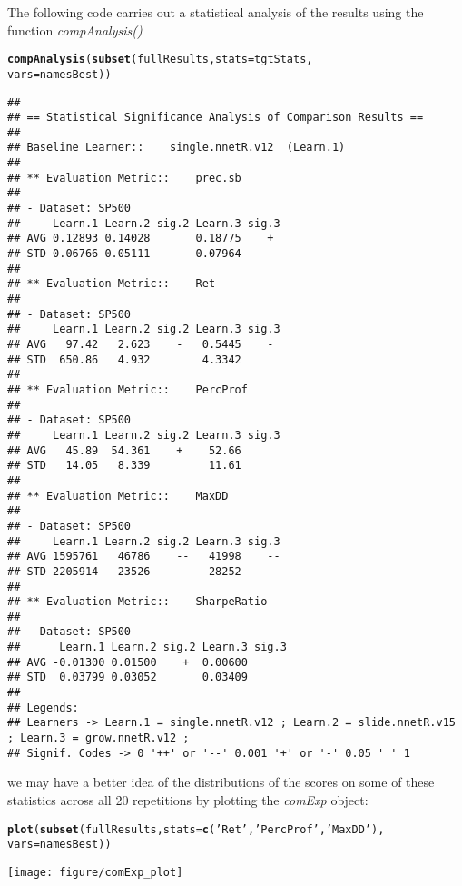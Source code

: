 \documentclass{article}\usepackage[]{graphicx}\usepackage[]{color}
\makeatletter
\def\maxwidth{ %
  \ifdim\Gin@nat@width>\linewidth
    \linewidth
  \else
    \Gin@nat@width
  \fi
}
\newcommand{\hlstr}[1]{\textcolor[rgb]{0.192,0.494,0.8}{#1}}%
\newcommand{\hlstd}[1]{\textcolor[rgb]{0.345,0.345,0.345}{#1}}%
\newcommand{\hlkwc}[1]{\textcolor[rgb]{0.333,0.667,0.333}{#1}}%
\newcommand{\hlkwd}[1]{\textcolor[rgb]{0.737,0.353,0.396}{\textbf{#1}}}%
\newenvironment{kframe}{%
 \def\at@end@of@kframe{}%
 \ifinner\ifhmode%
  \def\at@end@of@kframe{\end{minipage}}%
  \begin{minipage}{\columnwidth}%
 \fi\fi%
 \def\FrameCommand##1{\hskip\@totalleftmargin \hskip-\fboxsep
 \colorbox{shadecolor}{##1}\hskip-\fboxsep
     \hskip-\linewidth \hskip-\@totalleftmargin \hskip\columnwidth}%
 \MakeFramed {\advance\hsize-\width
   \@totalleftmargin\z@ \linewidth\hsize
   \@setminipage}}%
 {\par\unskip\endMakeFramed%
 \at@end@of@kframe}
\newenvironment{knitrout}{}{} %
\makeatother
\begin{document}
The following code carries out a statistical analysis of the results using the function \textit{compAnalysis()}
\begin{knitrout}
\color{fgcolor}\begin{kframe}
\begin{alltt}
\hlkwd{compAnalysis}\hlstd{(}\hlkwd{subset}\hlstd{(fullResults,} \hlkwc{stats} \hlstd{= tgtStats,}
                   \hlkwc{vars} \hlstd{= namesBest))}
\end{alltt}
\begin{verbatim}
## 
## == Statistical Significance Analysis of Comparison Results ==
## 
## Baseline Learner::	 single.nnetR.v12  (Learn.1)
## 
## ** Evaluation Metric::	 prec.sb 
## 
## - Dataset: SP500 
##     Learn.1 Learn.2 sig.2 Learn.3 sig.3
## AVG 0.12893 0.14028       0.18775    + 
## STD 0.06766 0.05111       0.07964      
## 
## ** Evaluation Metric::	 Ret 
## 
## - Dataset: SP500 
##     Learn.1 Learn.2 sig.2 Learn.3 sig.3
## AVG   97.42   2.623    -   0.5445    - 
## STD  650.86   4.932        4.3342      
## 
## ** Evaluation Metric::	 PercProf 
## 
## - Dataset: SP500 
##     Learn.1 Learn.2 sig.2 Learn.3 sig.3
## AVG   45.89  54.361    +    52.66      
## STD   14.05   8.339         11.61      
## 
## ** Evaluation Metric::	 MaxDD 
## 
## - Dataset: SP500 
##     Learn.1 Learn.2 sig.2 Learn.3 sig.3
## AVG 1595761   46786    --   41998    --
## STD 2205914   23526         28252      
## 
## ** Evaluation Metric::	 SharpeRatio 
## 
## - Dataset: SP500 
##      Learn.1 Learn.2 sig.2 Learn.3 sig.3
## AVG -0.01300 0.01500    +  0.00600      
## STD  0.03799 0.03052       0.03409      
## 
## Legends:
## Learners -> Learn.1 = single.nnetR.v12 ; Learn.2 = slide.nnetR.v15 ; Learn.3 = grow.nnetR.v12 ; 
## Signif. Codes -> 0 '++' or '--' 0.001 '+' or '-' 0.05 ' ' 1
\end{verbatim}
\end{kframe}
\end{knitrout}
we may have a better idea of the distributions of the scores on some of these statistics across all 20 repetitions by plotting the \textit{comExp}
object:
\begin{knitrout}
\color{fgcolor}\begin{kframe}
\begin{alltt}
\hlkwd{plot}\hlstd{(}\hlkwd{subset}\hlstd{(fullResults,} \hlkwc{stats} \hlstd{=} \hlkwd{c}\hlstd{(}\hlstr{'Ret'}\hlstd{,} \hlstr{'PercProf'}\hlstd{,} \hlstr{'MaxDD'}\hlstd{),}
            \hlkwc{vars} \hlstd{= namesBest))}
\end{alltt}
\end{kframe}
\texttt{[image: figure/comExp\_plot]} 

\end{knitrout}
\end{document}
